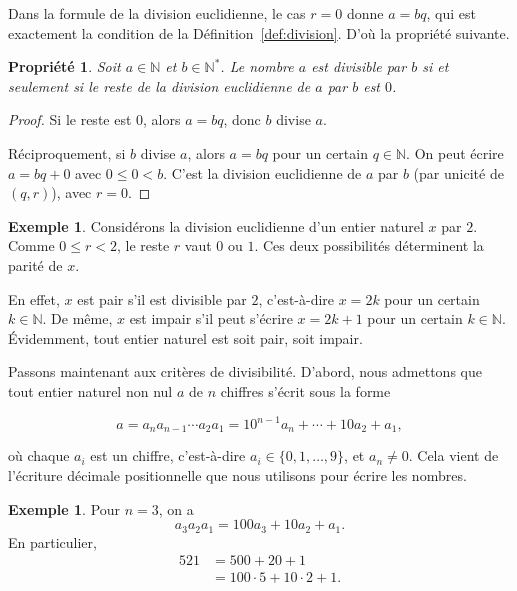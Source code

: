 \documentclass[12pt,a4paper]{article}
\theoremstyle{plain}
\newtheorem{property}[theorem]{Propriété}
\theoremstyle{definition}
\newtheorem{example}[theorem]{Exemple}
\theoremstyle{remark}
\begin{document}
Dans la formule de la division euclidienne, le cas $r = 0$ donne
$a = bq$, qui est exactement la condition de la
Définition~\ref{def:division}. D'où la propriété suivante.

\begin{tcolorbox}[graybar]
\begin{property}
  Soit $a \in \mathbb{N}$ et $b \in \mathbb{N}^*$. Le nombre $a$ est
  divisible par $b$ si et seulement si le reste de la division
  euclidienne de $a$ par $b$ est $0$.
\end{property}
\end{tcolorbox}

\begin{proof}
  Si le reste est $0$, alors $a = bq$, donc $b$ divise $a$.

  Réciproquement, si $b$ divise $a$, alors $a = bq$ pour un certain
  $q \in \mathbb{N}$. On peut écrire $a = bq + 0$ avec $0 \le 0 < b$.
  C'est la division euclidienne de $a$ par $b$ (par unicité de $(q,r)$), avec $r = 0$.
\end{proof}

\begin{example}
  Considérons la division euclidienne d'un entier naturel $x$ par $2$.
  Comme $0 \le r < 2$, le reste $r$ vaut $0$ ou $1$. Ces deux
  possibilités déterminent la parité de $x$.

  En effet, $x$ est pair s'il est divisible par $2$, c'est-à-dire
  $x = 2k$ pour un certain $k \in \mathbb{N}$. De même, $x$ est impair
  s'il peut s'écrire $x = 2k + 1$ pour un certain $k \in \mathbb{N}$.
  Évidemment, tout entier naturel est soit pair, soit impair.
\end{example}

Passons maintenant aux critères de divisibilité. D'abord, nous
admettons que tout entier naturel non nul $a$ de $n$ chiffres s'écrit
sous la forme

\[
  a = a_n a_{n-1} \cdots a_2 a_1
    = 10^{n-1}a_n + \cdots + 10a_2 + a_1,
\]

où chaque $a_i$ est un chiffre, c'est-à-dire
$a_i \in \{0,1,\dots,9\}$, et $a_n \neq 0$. Cela vient de l'écriture
décimale positionnelle que nous utilisons pour écrire les nombres.

\begin{example}
  Pour $n = 3$, on a
  \[
    a_3a_2a_1 = 100a_3 + 10a_2 + a_1.
  \]
  En particulier,
  \[
    \begin{aligned}
      521 &= 500 + 20 + 1 \\
          &= 100 \cdot 5 + 10 \cdot 2 + 1.
    \end{aligned}
  \]
\end{example}
\end{document}

